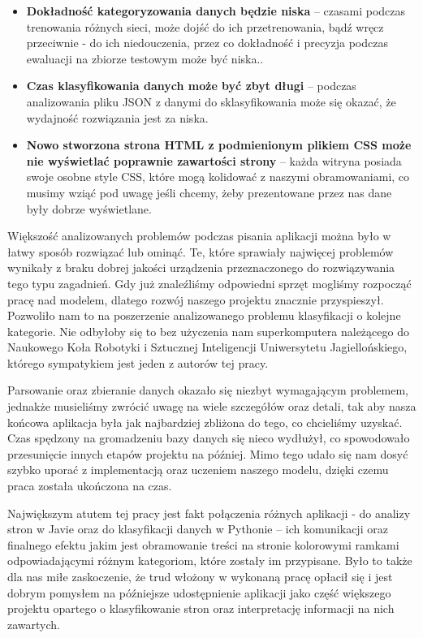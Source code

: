 \begin{itemize}[label=\textbullet]
\item \textbf{Dokładność kategoryzowania danych będzie niska} – czasami podczas trenowania różnych sieci, może dojść do ich przetrenowania, bądź wręcz przeciwnie - do ich niedouczenia, przez co dokładność i precyzja podczas ewaluacji na zbiorze testowym może być niska..

\item \textbf{Czas klasyfikowania danych może być zbyt długi} – podczas analizowania pliku JSON z danymi do sklasyfikowania może się okazać, że wydajność rozwiązania jest za niska.

\item \textbf{Nowo stworzona strona HTML z podmienionym plikiem CSS może nie wyświetlać poprawnie zawartości strony} – każda witryna posiada swoje osobne style CSS, które mogą kolidować z naszymi obramowaniami, co musimy wziąć pod uwagę jeśli chcemy, żeby prezentowane przez nas dane były dobrze wyświetlane.
\end{itemize}
Większość analizowanych problemów podczas pisania aplikacji można było w łatwy sposób rozwiązać lub ominąć. Te, które sprawiały najwięcej problemów wynikały z braku dobrej jakości urządzenia przeznaczonego do rozwiązywania tego typu zagadnień. Gdy już znaleźliśmy odpowiedni sprzęt mogliśmy rozpocząć pracę nad modelem, dlatego rozwój naszego projektu znacznie przyspieszył. Pozwoliło nam to na poszerzenie analizowanego problemu klasyfikacji o kolejne kategorie. Nie odbyłoby się to bez użyczenia nam superkomputera należącego do Naukowego Koła Robotyki i Sztucznej Inteligencji Uniwersytetu Jagiellońskiego, którego sympatykiem jest jeden z autorów tej pracy.
    
Parsowanie oraz zbieranie danych okazało się niezbyt wymagającym problemem, jednakże musieliśmy zwrócić uwagę na wiele szczegółów oraz detali, tak aby nasza końcowa aplikacja była jak najbardziej zbliżona do tego, co chcieliśmy uzyskać. Czas spędzony na gromadzeniu bazy danych się nieco wydłużył, co spowodowało przesunięcie innych etapów projektu na później. Mimo tego udało się nam dosyć szybko uporać z implementacją oraz uczeniem naszego modelu, dzięki czemu praca została ukończona na czas.

Największym atutem tej pracy jest fakt połączenia różnych aplikacji - do analizy stron w Javie oraz do klasyfikacji danych w Pythonie – ich komunikacji oraz finalnego efektu jakim jest obramowanie treści na stronie kolorowymi ramkami odpowiadającymi różnym kategoriom, które zostały im przypisane. Było to także dla nas miłe zaskoczenie, że trud włożony w wykonaną pracę opłacił się i jest dobrym pomysłem na późniejsze udostępnienie aplikacji jako część większego projektu opartego o klasyfikowanie stron oraz interpretację informacji na nich zawartych.


